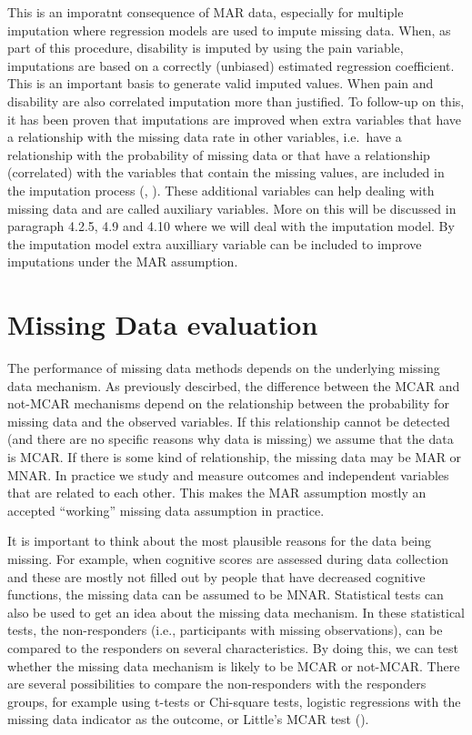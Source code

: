 \documentclass[
]{book}
\begin{document}
This is an imporatnt consequence of MAR data, especially for multiple imputation where regression models are used to impute missing data. When, as part of this procedure, disability is imputed by using the pain variable, imputations are based on a correctly (unbiased) estimated regression coefficient. This is an important basis to generate valid imputed values. When pain and disability are also correlated imputation more than justified. To follow-up on this, it has been proven that imputations are improved when extra variables that have a relationship with the missing data rate in other variables, i.e.~have a relationship with the probability of missing data or that have a relationship (correlated) with the variables that contain the missing values, are included in the imputation process (\citet{Collins2001}, \citet{Baraldi2010}). These additional variables can help dealing with missing data and are called auxiliary variables. More on this will be discussed in paragraph 4.2.5, 4.9 and 4.10 where we will deal with the imputation model. By the imputation model extra auxilliary variable can be included to improve imputations under the MAR assumption.

\hypertarget{missing-data-evaluation-1}{%
\section{Missing Data evaluation}\label{missing-data-evaluation-1}}

The performance of missing data methods depends on the underlying missing data mechanism. As previously descirbed, the difference between the MCAR and not-MCAR mechanisms depend on the relationship between the probability for missing data and the observed variables. If this relationship cannot be detected (and there are no specific reasons why data is missing) we assume that the data is MCAR. If there is some kind of relationship, the missing data may be MAR or MNAR. In practice we study and measure outcomes and independent variables that are related to each other. This makes the MAR assumption mostly an accepted ``working'' missing data assumption in practice.

It is important to think about the most plausible reasons for the data being missing. For example, when cognitive scores are assessed during data collection and these are mostly not filled out by people that have decreased cognitive functions, the missing data can be assumed to be MNAR. Statistical tests can also be used to get an idea about the missing data mechanism. In these statistical tests, the non-responders (i.e., participants with missing observations), can be compared to the responders on several characteristics. By doing this, we can test whether the missing data mechanism is likely to be MCAR or not-MCAR. There are several possibilities to compare the non-responders with the responders groups, for example using t-tests or Chi-square tests, logistic regressions with the missing data indicator as the outcome, or Little's MCAR test (\citet{Little1988}).
\end{document}
